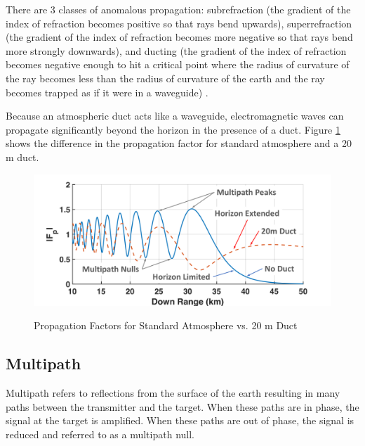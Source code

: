 There are 3 classes of anomalous propagation: subrefraction (the gradient of the index of refraction becomes positive so that rays bend upwards), superrefraction (the gradient of the index of refraction becomes more negative so that rays bend more strongly downwards), and ducting (the gradient of the index of refraction becomes negative enough to hit a critical point where the radius of curvature of the ray becomes less than the radius of curvature of the earth and the ray becomes trapped as if it were in a waveguide) \cite{blake_radar}.

Because an atmospheric duct acts like a waveguide, electromagnetic waves can propagate significantly beyond the horizon in the presence of a duct. Figure \ref{env_fig:2z} shows the difference in the propagation factor for standard atmosphere and a 20 m duct.

\begin{figure}[H]
  \begin{center}
\includegraphics[width=5in]{../media/multistatic/multipath.png}
  \end{center}
  \renewcommand{\baselinestretch}{1} \small\normalsize
  \begin{quote}
    \caption[Propagation Factors for Standard Atmosphere vs. 20 m Duct]{Propagation Factors for Standard Atmosphere vs. 20 m Duct\label{env_fig:2z}}
  \end{quote}
\end{figure}
\renewcommand{\baselinestretch}{2} \small\normalsize

\subsection{Multipath}
Multipath refers to reflections from the surface of the earth resulting in many paths between the transmitter and the target. When these paths are in phase, the signal at the target is amplified. When these paths are out of phase, the signal is reduced and referred to as a multipath null.

